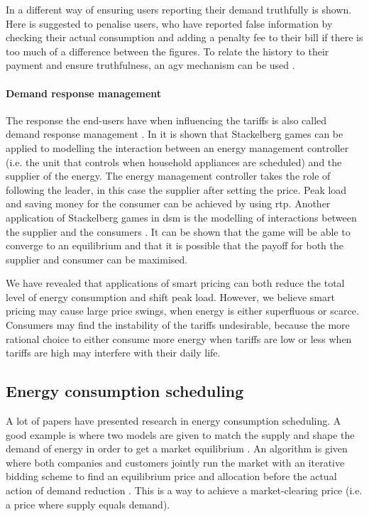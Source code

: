 In \cite{MaDengSongEtAl2014} a different way of ensuring users reporting their demand truthfully is shown. Here is suggested to penalise users, who have reported false information by checking their actual consumption and adding a penalty fee to their bill if there is too much of a difference between the figures. To relate the history to their payment and ensure truthfulness, an \ac{agv} mechanism can be used \cite{MaDengSongEtAl2014}.

\paragraph{Demand response management}
The response the end-users have when influencing the tariffs is also called demand response management \cite{MaharjanZhuZhangEtAl2013}. In \cite{ChenKishoreSnyder2011} it is shown that Stackelberg games can be applied to modelling the interaction between an energy management controller (i.e. the unit that controls when household appliances are scheduled) and the supplier of the energy. The energy management controller takes the role of following the leader, in this case the supplier after setting the price. Peak load and saving money for the consumer can be achieved by using \ac{rtp}. Another application of Stackelberg games in \ac{dsm} is the modelling of interactions between the supplier and the consumers \cite{MaharjanZhuZhangEtAl2013}. It can be shown that the game will be able to converge to an equilibrium and that it is possible that the payoff for both the supplier and consumer can be maximised. 

We have revealed that applications of smart pricing can both reduce the total level of energy consumption and shift peak load. However, we believe smart pricing may cause large price swings, when energy is either superfluous or scarce. Consumers may find the instability of the tariffs undesirable, because the more rational choice to either consume more energy when tariffs are low or less when tariffs are high may interfere with their daily life. 

\subsection{Energy consumption scheduling}
A lot of papers have presented research in energy consumption scheduling. A good example is where two models are given to match the supply and shape the demand of energy in order to get a market equilibrium \cite{ChenLiLowEtAl2010}. An algorithm is given where both companies and customers jointly run the market with an iterative bidding scheme to find an equilibrium price and allocation before the actual action of demand reduction \cite{ChenLiLowEtAl2010}. This is a way to achieve a market-clearing price (i.e. a price where supply equals demand).

